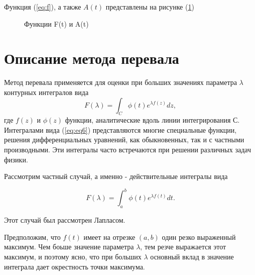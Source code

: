 \documentclass[%
bachelor,    %
natbib,      %
subf,        %
href,        %
colorlinks,  %
]{disser}
\newcommand{\sectionbreak}{\clearpage}
\begin{document}
Функция (\ref{eq:f}), а также $A(t)$ представлены на рисунке (\ref{ris:f_a})

\begin{figure}[h]
	\caption{Функции F(t) и A(t)}
	\label{ris:f_a}
\end{figure}
\sectionbreak

\section{Описание метода перевала} 

Метод перевала применяется для оценки при больших значениях параметра $\lambda$ контурных интегралов вида
\begin{equation}\label{eq:eq6}
F(\lambda) = \int_{C}^{}\phi(t)e^{\lambda f(z)}dz,
\end{equation} 
где $f(z)$ и $\phi(z)$ функции, аналитические вдоль линии интегрирования С. Интегралами вида (\ref{eq:eq6}) представляются многие специальные функции, решения дифференциальных уравнений, как обыкновенных, так и с частными производными. Эти интегралы часто встречаются при решении различных задач физики.\cite{Lavrentyev}

Рассмотрим частный случай, а именно - действительные интегралы вида

\begin{equation}\label{eq:eq7}
F(\lambda) = \int_{a}^{b}\phi(t)e^{\lambda f(t)}dt.
\end{equation} 

Этот случай был рассмотрен Лапласом. 

Предположим, что $f(t)$ имеет на отрезке $(a, b)$ один резко выраженный максимум. Чем боьше значение параметра $\lambda$, тем резче выражается этот максимум, и поэтому ясно, что при больших $\lambda$ основный вклад в значение интеграла дает окрестность точки максимума. 
\end{document}
